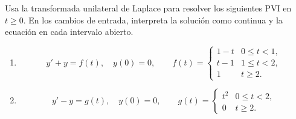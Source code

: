 Usa la transformada unilateral de Laplace para resolver los siguientes PVI en \(t\ge0\). En los cambios de entrada, interpreta la solución como continua y la ecuación en cada intervalo abierto.

\begin{enumerate}[label=(\alph*),ref=\alph*,leftmargin=*]
\item \[y'+y=f(t),\quad y(0)=0,\qquad f(t)=\begin{cases}1-t&0\le t<1,\\t-1&1\le t<2,\\1&t\ge2.\end{cases}\]
\item \[y'-y=g(t),\quad y(0)=0,\qquad g(t)=\begin{cases}t^2&0\le t<2,\\0&t\ge2.\end{cases}\]
\end{enumerate}
